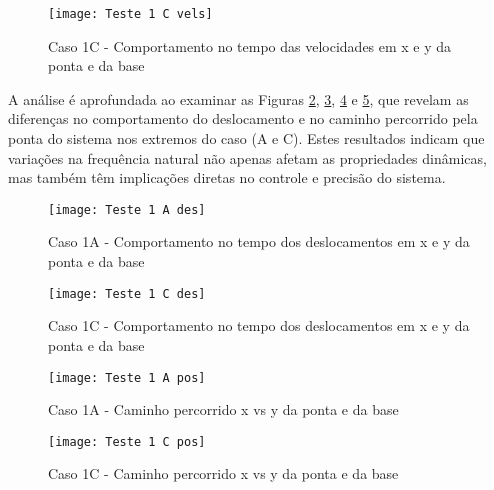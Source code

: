 \begin{figure}[H]
    \begin{center}
    \caption{Caso 1C - Comportamento no tempo das velocidades em x e y da ponta e da base}
    \texttt{[image: Teste 1 C vels]}
    \label{fig:t_1c_vels}
    \end{center}
\end{figure}

A análise é aprofundada ao examinar as Figuras \ref{fig:t_1a_des}, \ref{fig:t_1c_des}, \ref{fig:t_1a_pos} e \ref{fig:t_1c_pos}, que revelam as diferenças no comportamento do deslocamento e no caminho percorrido pela ponta do sistema nos extremos do caso (A e C). Estes resultados indicam que variações na frequência natural não apenas afetam as propriedades dinâmicas, mas também têm implicações diretas no controle e precisão do sistema.

\begin{figure}[H]
    \begin{center}
    \caption{Caso 1A - Comportamento no tempo dos deslocamentos em x e y da ponta e da base}
    \texttt{[image: Teste 1 A des]}
    \label{fig:t_1a_des}
    \end{center}
\end{figure}

\begin{figure}[H]
    \begin{center}
    \caption{Caso 1C - Comportamento no tempo dos deslocamentos em x e y da ponta e da base}
    \texttt{[image: Teste 1 C des]}
    \label{fig:t_1c_des}
    \end{center}
\end{figure}

\begin{figure}[H]
    \begin{center}
    \caption{Caso 1A - Caminho percorrido x vs y da ponta e da base}
    \texttt{[image: Teste 1 A pos]}
    \label{fig:t_1a_pos}
    \end{center}
\end{figure}

\begin{figure}[H]
    \begin{center}
    \caption{Caso 1C - Caminho percorrido x vs y da ponta e da base}
    \texttt{[image: Teste 1 C pos]}
    \label{fig:t_1c_pos}
    \end{center}
\end{figure}

